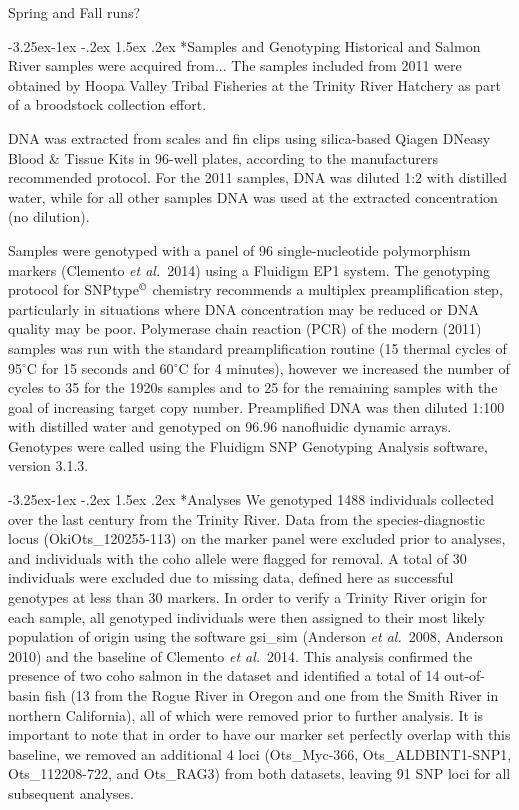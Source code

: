\documentclass[twoside,10pt,twocolumn]{article}
\makeatletter
\newcommand{\etal}{{\em et al.}\ }
\renewcommand\subsection{\@startsection{subsection}{2}{\z@}%
                                     {-3.25ex\@plus -1ex \@minus -.2ex}%
                                     {1.5ex \@plus .2ex}%
                                     {\normalfont\normalsize\itshape}}
\makeatother
\begin{document}
Spring and Fall runs?

\subsection*{Samples and Genotyping}
Historical and Salmon River samples were acquired from...
The samples included from 2011 were obtained by Hoopa Valley Tribal Fisheries at the Trinity River Hatchery as part of a broodstock collection effort.

DNA was extracted from scales and fin clips using silica-based Qiagen DNeasy Blood \& Tissue Kits in 96-well plates, according to the manufacturers recommended protocol.  For the 2011 samples, DNA was diluted 1:2 with distilled water, while for all other samples DNA was used at the extracted concentration (no dilution). 

Samples were genotyped with a panel of 96 single-nucleotide polymorphism markers (Clemento \etal 2014) using a Fluidigm EP1 system. The genotyping protocol for SNPtype$^\copyright$ chemistry recommends a multiplex preamplification step, particularly in situations where DNA concentration may be reduced or DNA quality may be poor.  Polymerase chain reaction (PCR) of the modern (2011) samples was run with the standard preamplification routine (15 thermal cycles of 95\ensuremath{^\circ}C for 15 seconds and 60\ensuremath{^\circ}C for 4 minutes), however we increased the number of cycles to 35 for the 1920s samples and to 25 for the remaining samples with the goal of increasing target copy number.  Preamplified DNA was then diluted 1:100 with distilled water and genotyped on 96.96 nanofluidic dynamic arrays. Genotypes were called using the Fluidigm SNP Genotyping Analysis software, version 3.1.3.

\subsection*{Analyses}
We genotyped 1488 individuals collected over the last century from the Trinity River. Data from the species-diagnostic locus (OkiOts\_120255-113) on the marker panel were excluded prior to analyses, and individuals with the coho allele were flagged for removal.  A total of 30 individuals were excluded due to missing data, defined here as successful genotypes at less than 30 markers.  In order to verify a Trinity River origin for each sample, all genotyped individuals were then assigned to their most likely population of origin using the software gsi\_sim (Anderson \etal 2008, Anderson 2010) and the baseline of Clemento \etal 2014.  This analysis confirmed the presence of two coho salmon in the dataset and identified a total of 14 out-of-basin fish (13 from the Rogue River in Oregon and one from the Smith River in northern California), all of which were removed prior to further analysis. It is important to note that in order to have our marker set perfectly overlap with this baseline, we removed an additional 4 loci (Ots\_Myc-366, Ots\_ALDBINT1-SNP1,  Ots\_112208-722, and Ots\_RAG3) from both datasets, leaving 91 SNP loci for all subsequent analyses.
\end{document}
